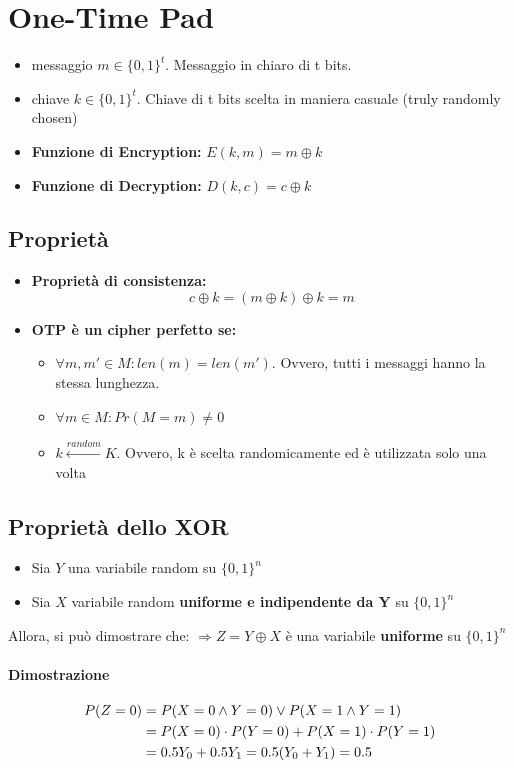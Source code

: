 \documentclass[a4paper,12pt]{article}
\begin{document}
\section{One-Time Pad}
\begin{itemize}
	\item messaggio $m \in \{0,1\}^t$. Messaggio in chiaro di t bits.
	\item chiave $k \in \{0,1\}^t$. Chiave di t bits scelta in maniera casuale (truly randomly chosen)
	\item \textbf{Funzione di Encryption: }$E(k, m) = m \oplus k$
	\item \textbf{Funzione di Decryption: }$D(k, c) = c \oplus k$
\end{itemize}

\subsection{Proprietà}
\begin{itemize}
	\item \textbf{Proprietà di consistenza:} $$ c \oplus k = (m \oplus k) \oplus k = m$$
	\item \textbf{OTP è un cipher perfetto se:}
	\begin{itemize}
		\item $\forall m, m' \in M : len(m) = len(m')$. Ovvero, tutti i messaggi hanno la stessa lunghezza.
		\item $\forall m \in M : Pr(M = m) \neq 0$
		\item $k \xleftarrow{random} K$. Ovvero, k è scelta randomicamente ed è utilizzata solo una volta
	\end{itemize}
\end{itemize}

\subsection{Proprietà dello XOR}
\begin{itemize}
	\item Sia $Y$ una variabile random su $\{0,1\}^n$
	\item Sia $X$ variabile random \textbf{uniforme e indipendente da Y} su $\{0,1\}^n$
\end{itemize}
Allora, si può dimostrare che:
$\Rightarrow Z = Y \oplus X$ è una variabile \textbf{uniforme} su $\{0,1\}^n$ 

\paragraph{Dimostrazione}
\begin{align}
P(Z = 0) &= P(X = 0 \land Y = 0) \lor P(X = 1 \land Y = 1) \notag\\
& = P(X = 0) \cdot P(Y = 0) + P(X = 1) \cdot P(Y = 1) \notag\\
& = 0.5Y_0 + 0.5Y_1 = 0.5(Y_0 + Y_1) = 0.5 \notag
\end{align}
\end{document}
